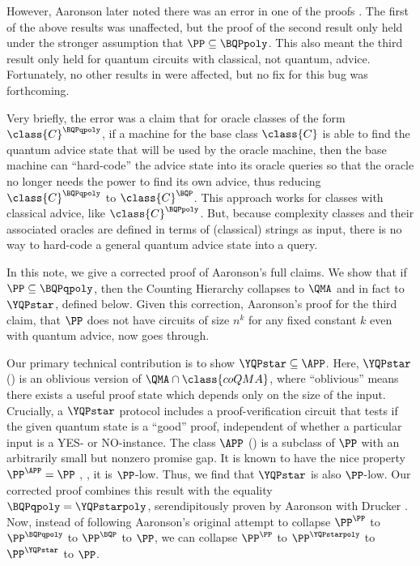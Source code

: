 However, Aaronson later noted there was an error in one of the proofs \cite{aaronsonBlogErrors2017}.
The first of the above results was unaffected,
but the proof of the second result only held under the stronger assumption that
$\PP\subseteq \BQPpoly$.
This also meant the third result only held for quantum circuits with classical,
not quantum, advice.
Fortunately, no other results in \cite{aaronson_subtle} were affected,
but no fix for this bug
was forthcoming.

Very briefly, the error was a claim that for oracle classes of the form
$\class{C}^{\BQPqpoly}$, if a machine for the base class $\class{C}$
is able to find the quantum advice state that will be used by the oracle machine,
then the base machine can ``hard-code'' the advice state into its oracle queries so that
the oracle no longer needs the power to find its own advice,
thus reducing $\class{C}^{\BQPqpoly}$ to $\class{C}^{\BQP}$.
This approach works for classes with classical advice, like $\class{C}^{\BQPpoly}$.
But, because complexity classes and their associated oracles
are defined in terms of (classical) strings as input,
there is no way to hard-code a general quantum advice state into a query.

In this note, we give a corrected proof of Aaronson's full claims.
We show that if $\PP\subseteq \BQPqpoly$,
then the Counting Hierarchy collapses to $\QMA$ and in fact to $\YQPstar$, defined below.
Given this correction, Aaronson's proof for the third claim,
that $\PP$ does not have circuits of size $n^k$
for any fixed constant $k$ even with quantum advice, now goes through.

Our primary technical contribution is to show $\YQPstar \subseteq \APP$.
Here, $\YQPstar$
%
%
() %
is an oblivious version of $\QMA\cap\class{coQMA}$, 
where ``oblivious'' means
there exists a useful proof state which depends only on the size of the input.
Crucially, a $\YQPstar$ protocol includes a proof-verification circuit that tests
if the given quantum state is a ``good'' proof, independent of whether
a particular input is a YES- or NO-instance.
The class $\APP$  %
%
() %
is a subclass of $\PP$ with an arbitrarily small but nonzero promise gap.
It is known to have the nice property $\PP^\APP = \PP$ \cite{li1993counting}, \ie{}, it is $\PP$-low.
Thus, we find that $\YQPstar$ is also $\PP$-low.
Our corrected proof combines this result with
the equality $\BQPqpoly = \YQPstarpoly$,
serendipitously proven by Aaronson with Drucker \cite{aaronson2014full}.
Now, instead of following Aaronson's original attempt to collapse $\PP^\PP$ to $\PP^\BQPqpoly$ to $\PP^\BQP$ to $\PP$,
we can collapse $\PP^\PP$ to $\PP^\YQPstarpoly$ to $\PP^\YQPstar$ to $\PP$.

